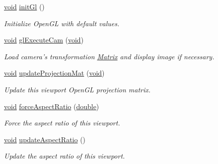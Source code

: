 \begin{DoxyCompactItemize}
\item 
\hyperlink{group___u_a_v_objects_plugin_ga444cf2ff3f0ecbe028adce838d373f5c}{void} \hyperlink{class_g_l_c___viewport_a1b0284e1abddd110cacea1e8c05b2088}{init\-Gl} ()
\begin{DoxyCompactList}\small\item\em Initialize Open\-G\-L with default values. \end{DoxyCompactList}\item 
\hyperlink{group___u_a_v_objects_plugin_ga444cf2ff3f0ecbe028adce838d373f5c}{void} \hyperlink{class_g_l_c___viewport_a63a56f0ef45829af82aa8aad3b673064}{gl\-Execute\-Cam} (\hyperlink{group___u_a_v_objects_plugin_ga444cf2ff3f0ecbe028adce838d373f5c}{void})
\begin{DoxyCompactList}\small\item\em Load camera's transformation \hyperlink{class_matrix}{Matrix} and display image if necessary. \end{DoxyCompactList}\item 
\hyperlink{group___u_a_v_objects_plugin_ga444cf2ff3f0ecbe028adce838d373f5c}{void} \hyperlink{class_g_l_c___viewport_ac88ee30ea4b9bd5acf6a02f4d2450ae0}{update\-Projection\-Mat} (\hyperlink{group___u_a_v_objects_plugin_ga444cf2ff3f0ecbe028adce838d373f5c}{void})
\begin{DoxyCompactList}\small\item\em Update this viewport Open\-G\-L projection matrix. \end{DoxyCompactList}\item 
\hyperlink{group___u_a_v_objects_plugin_ga444cf2ff3f0ecbe028adce838d373f5c}{void} \hyperlink{class_g_l_c___viewport_a170ad278ec50de888ec21d810bfea52d}{force\-Aspect\-Ratio} (\hyperlink{_super_l_u_support_8h_a8956b2b9f49bf918deed98379d159ca7}{double})
\begin{DoxyCompactList}\small\item\em Force the aspect ratio of this viewport. \end{DoxyCompactList}\item 
\hyperlink{group___u_a_v_objects_plugin_ga444cf2ff3f0ecbe028adce838d373f5c}{void} \hyperlink{class_g_l_c___viewport_aea26c8aca2c3d82d5f7a787754cb9097}{update\-Aspect\-Ratio} ()
\begin{DoxyCompactList}\small\item\em Update the aspect ratio of this viewport. \end{DoxyCompactList}\item 

\end{DoxyCompactItemize}
